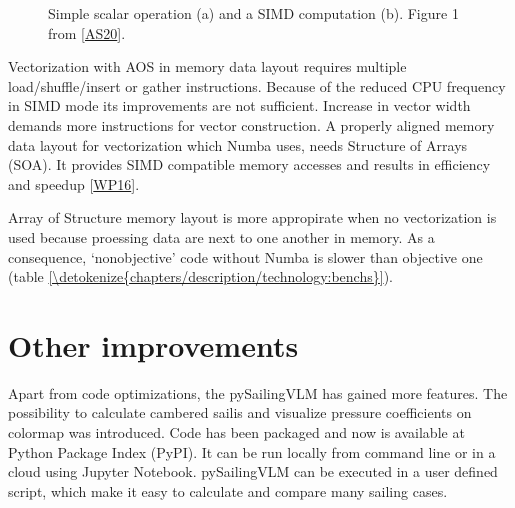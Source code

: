\documentclass[a4paper,12pt,english]{jupyterBook}
\let\sphinxpxdimen\pdfpxdimen\else\newdimen\sphinxpxdimen
\begin{document}
\begin{figure}[htbp]
\centering
\capstart

\noindent\sphinxincludegraphics[height=200\sphinxpxdimen]{{simd_fig}.png}
\caption{Simple scalar operation (a) and a SIMD computation (b). Figure 1 from {[}\hyperlink{cite.chapters/bibliography:id12}{AS20}{]}.}\label{\detokenize{chapters/description/technology:simd-fig}}\end{figure}

\sphinxAtStartPar
Vectorization with AOS in memory data layout requires multiple load/shuffle/insert or gather instructions. Because of the reduced CPU frequency in SIMD mode its improvements are not sufficient. Increase in vector width demands more instructions for vector construction. A properly aligned memory data layout for vectorization which Numba uses, needs Structure of Arrays (SOA). It provides SIMD compatible memory accesses and results in efficiency and speedup {[}\hyperlink{cite.chapters/bibliography:id13}{WP16}{]}.

\sphinxAtStartPar
Array of Structure memory layout is more appropirate when no vectorization is used because proessing data are next to one another in memory. As a consequence, ‘non\sphinxhyphen{}objective’ code without Numba is slower than objective one (table \hyperref[\detokenize{chapters/description/technology:benchs}]{\ref{\detokenize{chapters/description/technology:benchs}}}).


\part{Other improvements}
\label{\detokenize{chapters/description/technology:other-improvements}}
\sphinxAtStartPar
Apart from code optimizations, the pySailingVLM has gained more features. The possibility to calculate cambered sailis and visualize pressure coefficients on colormap was introduced. Code has been packaged and now is available at Python Package Index (PyPI). It can be run locally from command line or in a cloud using Jupyter Notebook. pySailingVLM can be executed in a user defined script, which make it easy to calculate and compare many sailing cases.







\renewcommand{\indexname}{Index}
\printindex
\end{document}
